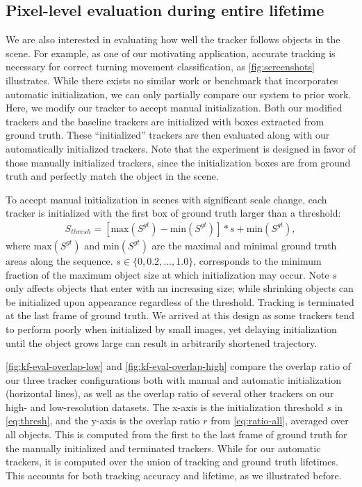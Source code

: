 \subsection{Pixel-level evaluation during entire lifetime} 
\label{subsec:tracker-eval-overall}

We are also interested in evaluating how well the tracker follows objects in the scene. For example, as one of our motivating application, accurate tracking is necessary for correct turning movement classification, as \ref{fig:screenshots} illustrates.
While there exists no similar work or benchmark that incorporates automatic initialization, we can only partially compare our system to prior work. Here, we modify our tracker to accept manual initialization. Both our modified trackers and the baseline trackers are initialized with boxes extracted from ground truth. These ``initialized'' trackers are then evaluated along with our automatically initialized trackers. Note that the experiment is designed in favor of those manually initialized trackers, since the initialization boxes are from ground truth and perfectly match the object in the scene.

To accept manual initialization in scenes with significant scale change, each tracker is initialized with the first box of ground truth larger than a threshold: 
\begin{align}
    S_{thresh}=\left[\text{max}(S^{gt})-\text{min}(S^{gt})\right]*s + \text{min}(S^{gt}),
    \label{eq:thresh}
\end{align}
where $\text{max}(S^{gt})$ and $\text{min}(S^{gt})$ are the maximal and minimal ground truth areas along the sequence. $s\in \{0, 0.2, \dots, 1.0\}$, corresponds to the minimum fraction of the maximum object size at which initialization may occur. Note $s$ only affects objects that enter with an increasing size; while shrinking objects can be initialized upon appearance regardless of the threshold. 
Tracking is terminated at the last frame of ground truth. 
We arrived at this design as some trackers tend to perform poorly when initialized by small images, yet delaying initialization until the object grows large can result in arbitrarily shortened trajectory.

\ref{fig:kf-eval-overlap-low} and \ref{fig:kf-eval-overlap-high} compare the overlap ratio of our three tracker configurations both with manual and automatic initialization (horizontal lines), as well as the overlap ratio of several other trackers on our high- and low-resolution datasets. 
The x-axis is the initialization threshold $s$ in \ref{eq:thresh}, and the y-axis is the overlap ratio $r$ from \ref{eq:ratio-all}, averaged over all objects.
This is computed from the first to the last frame of ground truth for the manually initialized and terminated trackers. While for our automatic trackers, it is computed over the union of tracking and ground truth lifetimes. This accounts for both tracking accuracy and lifetime, as we illustrated before.

